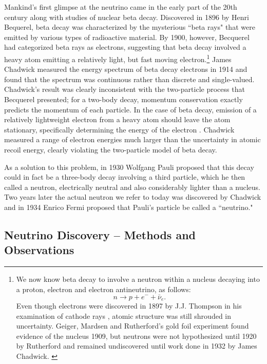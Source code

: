Mankind's first glimpse at the neutrino came in the early part of the 20th century along with studies of nuclear beta decay.  Discovered in 1896 by Henri Bequerel, beta decay was characterized by the mysterious ``beta rays" that were emitted by various types of radioactive material.  \cite{becquerelBeta}  By 1900, however, Becquerel had categorized beta rays as electrons, suggesting that beta decay involved a heavy atom emitting a relatively light, but fast moving electron.\footnote{
We now know beta decay to involve a neutron within a nucleus decaying into a proton, electron and electron antineutrino, as follows: 
\begin{equation*}      n \rightarrow p + e^- + \bar{\nu}_e  . \end{equation*}
Even though electrons were discovered in 1897 by J.J. Thompson in his examination of cathode rays \cite{thompson}, atomic structure was still shrouded in uncertainty.  Geiger, Mardsen and Rutherford's gold foil experiment found evidence of the nucleus 1909, but neutrons were not hypothesized until 1920 by Rutherford \cite{rutherfordNeutron} and remained undiscovered until work done in 1932 by James Chadwick. \cite{chadwickNeutron}
 } \cite{becquerelElec}  
James Chadwick measured the energy spectrum of beta decay electrons in 1914 and found that the spectrum was continuous rather than discrete and single-valued.\cite {chadwickBeta}  Chadwick's result was clearly inconsistent with the two-particle process that Becquerel presented; for a two-body decay, momentum conservation exactly predicts the momentum of each particle.  In the case of beta decay, emission of a relatively lightweight electron from a heavy atom should leave the atom stationary, specifically determining the energy of the electron .  Chadwick measured a range of electron energies much larger than the uncertainty in atomic recoil energy, clearly violating the two-particle model of beta decay.  

As a solution to this problem, in 1930 Wolfgang Pauli proposed that this decay could in fact be a three-body decay involving a third particle, which he then called a neutron, electrically neutral and also considerably lighter than a nucleus. \cite{pauliNeuProp}  Two years later the actual neutron we refer to today was discovered by Chadwick \cite{chadwickNeutron} and in 1934 Enrico Fermi proposed that Pauli's particle be called a ``neutrino." \cite{fermiNeuName} 

\subsection{Neutrino Discovery -- Methods and Observations}
\label{discovery}


